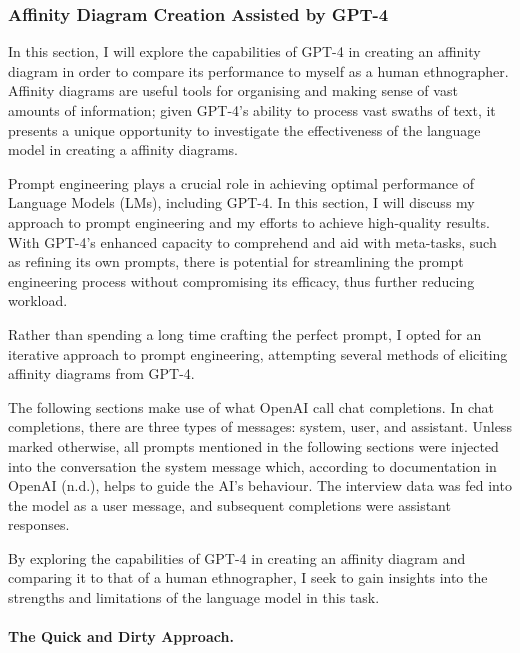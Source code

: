 \documentclass[
]{book}
\begin{document}
\hypertarget{affinity-diagram-creation-assisted-by-gpt-4}{%
\subsubsection{Affinity Diagram Creation Assisted by GPT-4}\label{affinity-diagram-creation-assisted-by-gpt-4}}

In this section, I will explore the capabilities of GPT-4 in creating an affinity diagram in order to compare its performance to myself as a human ethnographer. Affinity diagrams are useful tools for organising and making sense of vast amounts of information; given GPT-4's ability to process vast swaths of text, it presents a unique opportunity to investigate the effectiveness of the language model in creating a affinity diagrams.

Prompt engineering plays a crucial role in achieving optimal performance of Language Models (LMs), including GPT-4. In this section, I will discuss my approach to prompt engineering and my efforts to achieve high-quality results. With GPT-4's enhanced capacity to comprehend and aid with meta-tasks, such as refining its own prompts, there is potential for streamlining the prompt engineering process without compromising its efficacy, thus further reducing workload.

Rather than spending a long time crafting the perfect prompt, I opted for an iterative approach to prompt engineering, attempting several methods of eliciting affinity diagrams from GPT-4.

The following sections make use of what OpenAI call chat completions. In chat completions, there are three types of messages: system, user, and assistant. Unless marked otherwise, all prompts mentioned in the following sections were injected into the conversation the system message which, according to documentation in OpenAI (n.d.), helps to guide the AI's behaviour. The interview data was fed into the model as a user message, and subsequent completions were assistant responses.

By exploring the capabilities of GPT-4 in creating an affinity diagram and comparing it to that of a human ethnographer, I seek to gain insights into the strengths and limitations of the language model in this task.

\hypertarget{the-quick-and-dirty-approach.}{%
\paragraph{The Quick and Dirty Approach.}\label{the-quick-and-dirty-approach.}}
\end{document}
